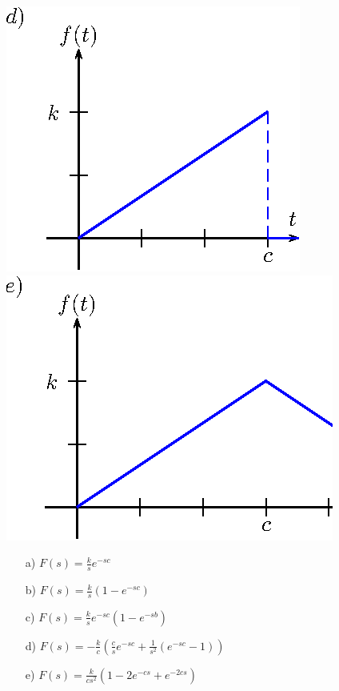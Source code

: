 \begin{exer}{\label{ex_cap_3_1}}
\begin{center}
\includegraphics{cap_definicao/pics/figura_7}
\includegraphics{cap_definicao/pics/figura_8}\end{center}
\end{exer}
\begin{resp}
 \begin{itemize}
  \item[a)] $\displaystyle F(s)=\frac{k}{s}e^{-sc}$
  \item[b)] $\displaystyle F(s)=\frac{k}{s}\left(1-e^{-sc}\right)$ 
  \item[c)] $\displaystyle F(s)=\frac{k}{s}e^{-sc}\left(1-e^{-sb}\right)$ 
  \item[d)] $\displaystyle F(s)=-\frac{k}{c}\left(\frac{c}{s}e^{-sc}+\frac{1}{s^2}\left(e^{-sc}-1\right)\right)$
  \item[e)] $\displaystyle F(s)=\frac{k}{cs^2}\left(1-2e^{-cs}+e^{-2cs}\right)$
 \end{itemize}
\end{resp}
